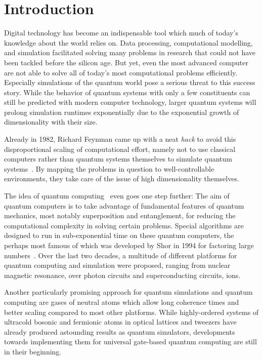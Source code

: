 \renewcommand{\imagepath}{../10-intro/img}

\chapter{Introduction}
Digital technology has become an indispensable tool which much of today's knowledge about the world relies on. Data processing, computational modelling, and simulation facilitated solving many problems in research that could not have been tackled before the silicon age. But yet, even the most advanced computer are not able to solve all of today's  most computational problems efficiently. Especially simulations of the quantum world pose a serious threat to this success story. While the behavior of quantum systems with only a few constituents can still be predicted with modern computer technology, larger quantum systems will prolong simulation runtimes exponentially due to the exponential growth of dimensionality with their size.

Already in 1982, Richard Feynman came up with a neat \textit{hack} to avoid this disproportional scaling of computational effort, namely not to use classical computers rather than quantum systems themselves to simulate quantum systems~\cite{feynman_simulating_1982}. By mapping the problems in question to well-controllable environments, they take care of the issue of high dimensionality themselves.

The idea of quantum computing~\cite{nielsen_quantum_2010, hidary_quantum_2021, mainzer_quantencomputer_2020} even goes one step further: The aim of quantum computers is to take advantage of fundamental features of quantum mechanics, most notably superposition and entanglement, for reducing the computational complexity in solving certain problems. Special algorithms are designed to run in sub-exponential time on these quantum computers, the perhaps most famous of which was developed by Shor in 1994 for factoring large numbers~\cite{shor_algorithms_1994}. Over the last two decades, a multitude of different platforms for quantum computing and simulation were proposed, ranging from nuclear magnetic resonance, over photon circuits and superconducting circuits, ions. 

Another particularly promising approach for quantum simulations and quantum computing are gases of neutral atoms which allow long coherence times and better scaling compared to most other platforms. While highly-ordered systems of ultracold bosonic and fermionic atoms in optical lattices and tweezers have already produced astounding results as quantum simulators, developments towards implementing them for universal gate-based quantum computing are still in their beginning.

